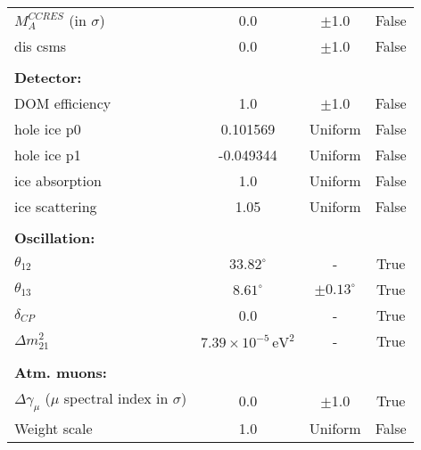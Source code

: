\begin{table}
\begin{tabular}{lccc}
$M_{A}^{CCRES}$ (in $\sigma$)& 0.0 & $\pm$1.0 & False  \\
dis csms & 0.0  & $\pm$1.0 & False \\ \hline
&&& \\ \hline
\textbf{Detector:}        &  & &  \\
DOM efficiency & 1.0  & $\pm$1.0 & False \\
hole ice p0 & 0.101569  & Uniform & False \\
hole ice p1 & -0.049344  & Uniform & False \\
ice absorption & 1.0  & Uniform & False \\
ice scattering & 1.05 & Uniform & False \\ \hline
&&& \\ \hline
\textbf{Oscillation:}   &     &    \\
$\theta_{12}$   & $33.82^{\circ}$  & - & True \\
$\theta_{13}$   & $8.61^{\circ}$  & $\pm0.13^{\circ}$ & True \\
$\delta_{CP}$   & 0.0  & - & True \\
$\Delta m^2_{21}$   & $7.39\times 10^{-5}\,\mathrm{eV}^2$  & - & True \\
\hline
&&& \\ \hline
\textbf{Atm. muons:}        &  &  &  \\
$\Delta \gamma_{\mu}$ ($\mu$ spectral index in $\sigma$)& 0.0  & $\pm$1.0 &  True \\
Weight scale & 1.0  & Uniform &  False \\
\hline \hline
\end{tabular}
\end{table}